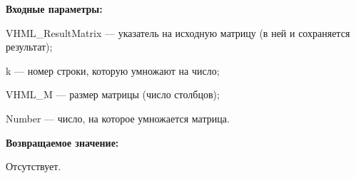 \textbf{Входные параметры:}

 VHML\_ResultMatrix --- указатель на исходную матрицу (в ней и сохраняется результат);
 
 k --- номер строки, которую умножают на число;
 
 VHML\_M --- размер матрицы (число столбцов);
 
 Number --- число, на которое умножается матрица.

\textbf{Возвращаемое значение:}

Отсутствует.